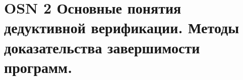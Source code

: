 \section*{OSN 2 Основные понятия дедуктивной верификации. Методы доказательства завершимости программ.}
